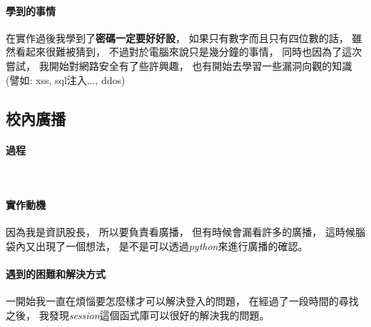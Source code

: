 \documentclass[12pt,oneside]{ctexart}
\begin{document}
\paragraph{ 學到的事情 }
\begin{adjustwidth}{2em}{0em}
    在實作過後我學到了\textbf{密碼一定要好好設}，
    如果只有數字而且只有四位數的話，
    雖然看起來很難被猜到，
    不過對於電腦來說只是幾分鐘的事情，
    同時也因為了這次嘗試，
    我開始對網路安全有了些許興趣，
    也有開始去學習一些漏洞向觀的知識(譬如: xss, sql注入..., ddos)
\end{adjustwidth}

\clearpage
\subsection{ 校內廣播 }


\paragraph{ 過程 }
\hspace*{\fill}\\
\begin{figure}[H]
\centering
{}
\end{figure}

\clearpage
\paragraph{ 實作動機 }
\begin{adjustwidth}{2em}{0em}
   因為我是資訊股長，
   所以要負責看廣播，
   但有時候會漏看許多的廣播，
   這時候腦袋內又出現了一個想法，
   是不是可以透過\textit{python}來進行廣播的確認。
\end{adjustwidth}

\paragraph{ 遇到的困難和解決方式 }
\begin{adjustwidth}{2em}{0em}
    一開始我一直在煩惱要怎麼樣才可以解決登入的問題，
    在經過了一段時間的尋找之後，
    我發現\textit{session}這個函式庫可以很好的解決我的問題。
\end{adjustwidth}
\end{document}

